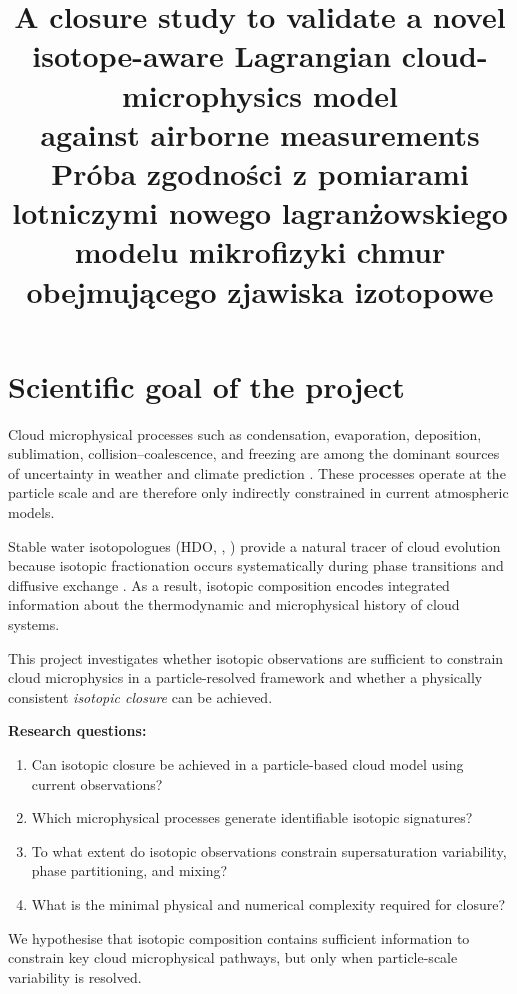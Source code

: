 \documentclass[12pt]{article}
\title{
    \textbf{A closure study to validate a novel isotope-aware
    Lagrangian cloud-microphysics model\\ against airborne measurements}\\[0.4em]
    \large Próba zgodności z pomiarami lotniczymi nowego lagranżowskiego modelu
    mikrofizyki chmur obejmującego zjawiska izotopowe
}
\date{}
\begin{document}
\maketitle

\section{Scientific goal of the project}

Cloud microphysical processes such as condensation, evaporation, deposition,
sublimation, collision--coalescence, and freezing are among the dominant sources
of uncertainty in weather and climate prediction \parencite{IPCC_2023}.
These processes
operate at the particle scale and are therefore only indirectly constrained in
current atmospheric models.

Stable water isotopologues (HDO, , ) provide a natural
tracer of cloud evolution because isotopic fractionation occurs systematically
during phase transitions and diffusive exchange \parencite{1994_Gedzelman_Arnold}.
As a result, isotopic composition encodes integrated information about the
thermodynamic and microphysical history of cloud systems.

This project investigates whether isotopic observations are sufficient to
constrain cloud microphysics in a particle-resolved framework and whether a
physically consistent \emph{isotopic closure} can be achieved.

\textbf{Research questions:}
\begin{enumerate}
\item Can isotopic closure be achieved in a particle-based cloud model using current observations?
\item Which microphysical processes generate identifiable isotopic signatures?
\item To what extent do isotopic observations constrain supersaturation variability,
phase partitioning, and mixing?
\item What is the minimal physical and numerical complexity required for closure?
\end{enumerate}

We hypothesise that isotopic composition contains sufficient information to constrain
key cloud microphysical pathways, but only when particle-scale variability is resolved.

\end{document}
